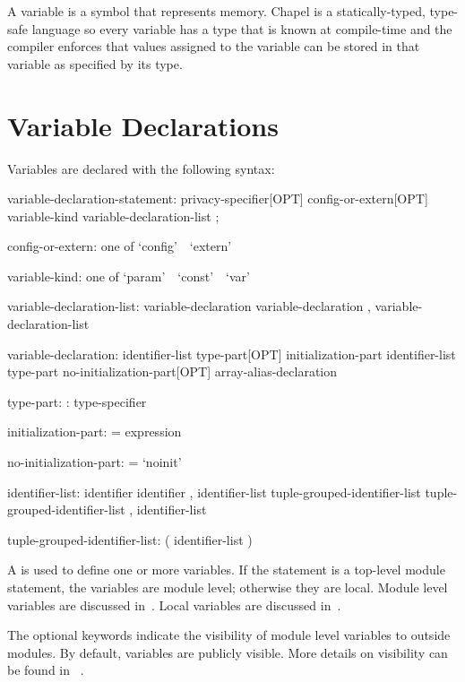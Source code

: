 \label{Variables}

A variable is a symbol that represents memory.  Chapel is a
statically-typed, type-safe language so every variable has a type that
is known at compile-time and the compiler enforces that values
assigned to the variable can be stored in that variable as specified
by its type.

\section{Variable Declarations}
\label{Variable_Declarations}

Variables are declared with the following syntax:
\begin{syntax}
variable-declaration-statement:
  privacy-specifier[OPT] config-or-extern[OPT] variable-kind variable-declaration-list ;

config-or-extern: one of
  `config' $ $ $ $ `extern'

variable-kind: one of
  `param' $ $ $ $ `const' $ $ $ $ `var'

variable-declaration-list:
  variable-declaration
  variable-declaration , variable-declaration-list

variable-declaration:
  identifier-list type-part[OPT] initialization-part
  identifier-list type-part no-initialization-part[OPT]
  array-alias-declaration

type-part:
  : type-specifier

initialization-part:
  = expression

no-initialization-part:
  = `noinit'

identifier-list:
  identifier
  identifier , identifier-list
  tuple-grouped-identifier-list
  tuple-grouped-identifier-list , identifier-list

tuple-grouped-identifier-list:
  ( identifier-list )
\end{syntax}
A  is used to define one or more
variables.  If the statement is a top-level module statement, the
variables are module level; otherwise they are local.  Module level variables are
discussed in~.  Local variables are discussed
in~.

The optional  keywords indicate the visibility
of module level variables to outside modules.  By default, variables
are publicly visible.  More details on visibility can be found in
~.

